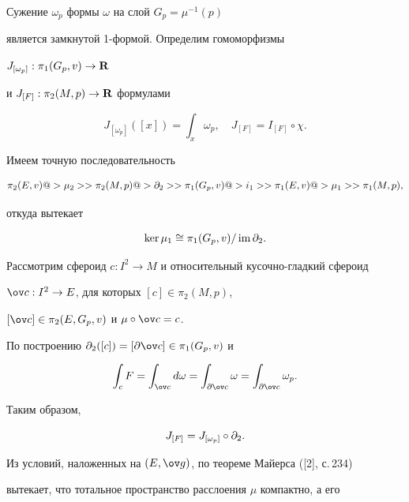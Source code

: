 \begin{pf}


Сужение $\omega_p$ формы $\omega$ на слой $G_p=\mu^{-1}(p)$


является замкнутой 1-формой. Определим гомоморфизмы


$J_{[\omega_p]}:\pi_1(G_p,v)\to{\bold R}$


и $J_{[F]}:\pi_2(M,p)\to{\bold R}$ формулами


$$


J_{[\omega_p]}([x])=\int_x\omega_p,\quad J_{[F]}=I_{[F]}\circ\chi.


$$


Имеем точную последовательность


$$


\pi_2(E,v)@>{\mu_2}>>\pi_2(M,p)@>{\p_2}>>\pi_1(G_p,v)


@>{i_1}>>\pi_1(E,v)@>{\mu_1}>>\pi_1(M,p),


$$


откуда вытекает


\begin{equation}


\ker\mu_1\cong\pi_1(G_p,v)/\im\p_2.


\end{equation}





Рассмотрим сфероид $c:I^2\to M$ и относительный кусочно-гладкий сфероид


$\ov c:I^2\to E$, для которых $[c]\in\pi_2(M,p)$,


$[\ov c]\in\pi_2(E,G_p,v)$ и $\mu\circ\ov c=c$.


По построению $\p_2([c])=[\p\ov c]\in\pi_1(G_p,v)$ и


$$


\int_c F=\int_{\ov c}d\omega= \int_{\p\ov


c}\omega=\int_{\p\ov c}\omega_p.


$$


Таким образом,


\begin{equation}


J_{[F]}=J_{[\omega_p]}\circ\p_2.


\end{equation}





Из условий, наложенных на $(E,\g)$, по теореме Майерса ([2], с.\,234)


вытекает, что тотальное пространство расслоения $\mu$ компактно, а его



\end{pf}
